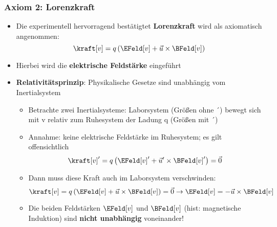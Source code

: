 \begin{frame}
  \frametitle{Axiom 2: Lorenzkraft}
\begin{itemize}[<+->]
\item Die experimentell hervorragend bestätigtet \textbf{Lorenzkraft} wird als axiomatisch angenommen:
  \begin{equation*}
    \kraft[v] = q \left( \EFeld[v] + \vec{u} \times \BFeld[v] \right)
  \end{equation*}
\item Hierbei wird die \textbf{elektrische Feldstärke} eingeführt
\item \textbf{Relativitätsprinzip}: Physikalische Gesetze sind unabhängig vom Inertialsystem
\begin{itemize}[<+->]
\item Betrachte zwei Inertialsysteme: Laborsystem (Größen ohne ´) bewegt sich mit v   relativ zum Ruhesystem der Ladung q (Größen mit ´)
\item Annahme: keine elektrische Feldstärke im Ruhesystem; es gilt offensichtlich
 \begin{equation*}
    \kraft[v]' = q \left( \EFeld[v]' + \vec{u}' \times \BFeld[v]' \right) = \vec{0}
  \end{equation*}

\item Dann muss diese Kraft auch im Laborsystem verschwinden:
 \begin{equation*}
    \kraft[v] = q \left( \EFeld[v] + \vec{u} \times \BFeld[v] \right) = \vec{0} \to \EFeld[v] = - \vec{u} \times \BFeld[v]
  \end{equation*}
\item Die beiden Feldstärken \(\EFeld[v]\) und \(\BFeld[v]\) (hist: magnetische Induktion) sind \textbf{nicht unabhängig} voneinander!
\end{itemize}
\end{itemize}
\end{frame}


